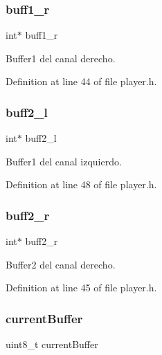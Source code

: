 \subsubsection{\texorpdfstring{buff1\+\_\+r}{buff1\_r}}
{\footnotesize\ttfamily int$\ast$ buff1\+\_\+r}



Buffer1 del canal derecho. 



Definition at line 44 of file player.\+h.

\mbox{\label{struct_b_u_f_f_e_r_s_a4b72ec787f878bb4946eb99959a9eee1}} 
\subsubsection{\texorpdfstring{buff2\+\_\+l}{buff2\_l}}
{\footnotesize\ttfamily int$\ast$ buff2\+\_\+l}



Buffer1 del canal izquierdo. 



Definition at line 48 of file player.\+h.

\mbox{\label{struct_b_u_f_f_e_r_s_a41f147f529b8c09dd8287a029d373b44}} 
\subsubsection{\texorpdfstring{buff2\+\_\+r}{buff2\_r}}
{\footnotesize\ttfamily int$\ast$ buff2\+\_\+r}



Buffer2 del canal derecho. 



Definition at line 45 of file player.\+h.

\mbox{\label{struct_b_u_f_f_e_r_s_a6559ce1afae303f5a6024afba9dbea8b}} 
\subsubsection{\texorpdfstring{current\+Buffer}{currentBuffer}}
{\footnotesize\ttfamily uint8\+\_\+t current\+Buffer}



